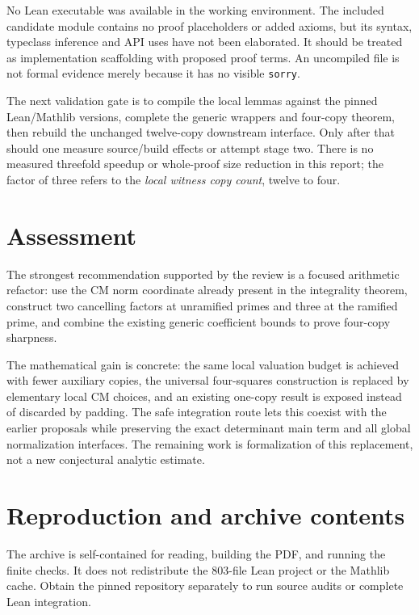 \documentclass[11pt,letterpaper]{article}
\theoremstyle{remark}\newtheorem{remark}[theorem]{Remark}
\begin{document}
No Lean executable was available in the working environment. The included
candidate module contains no proof placeholders or added axioms, but
its syntax, typeclass inference and API uses have not been elaborated.
It should be treated as implementation scaffolding with proposed proof
terms. An uncompiled file is not formal evidence merely because it has
no visible \texttt{sorry}.

The next validation gate is to compile the local lemmas against the pinned
Lean/Mathlib versions, complete the generic wrappers and four-copy theorem,
then rebuild the unchanged twelve-copy downstream interface. Only after
that should one measure source/build effects or attempt stage two.
There is no measured threefold speedup or whole-proof size reduction in
this report; the factor of three refers to the \emph{local witness copy
count}, twelve to four.

\section{Assessment}

The strongest recommendation supported by the review is a focused
arithmetic refactor: use the CM norm coordinate already present in the
integrality theorem, construct two cancelling factors at unramified primes
and three at the ramified prime, and combine the existing generic
coefficient bounds to prove four-copy sharpness.

The mathematical gain is concrete: the same local valuation budget is
achieved with fewer auxiliary copies, the universal four-squares
construction is replaced by elementary local CM choices, and an existing
one-copy result is exposed instead of discarded by padding. The safe
integration route lets this coexist with the earlier proposals while
preserving the exact determinant main term and all global normalization
interfaces. The remaining work is formalization of this replacement,
not a new conjectural analytic estimate.

\appendix
\section{Reproduction and archive contents}

The archive is self-contained for reading, building the PDF, and running
the finite checks. It does not redistribute the 803-file Lean project or
the Mathlib cache. Obtain the pinned repository separately to run source
audits or complete Lean integration.
\end{document}
